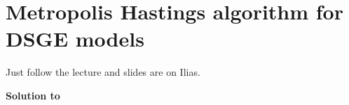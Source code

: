 \section[Metropolis Hastings algorithm for DSGE models]{Metropolis Hastings algorithm for DSGE models\label{ex:MetropolisHastingsDSGE}}
Just follow the lecture and slides are on Ilias.

\begin{solution}\textbf{Solution to }
\ifDisplaySolutions

\fi
\newpage
\end{solution}